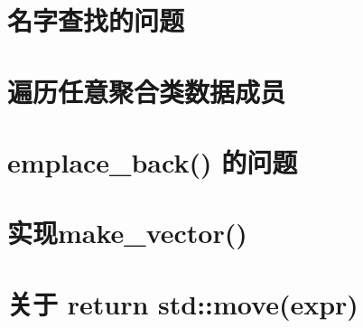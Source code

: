 \documentclass[11pt,fancyhdr]{ctexart}
\begin{document}
\section{名字查找的问题}

\section{遍历任意聚合类数据成员}

\section{emplace\_back() 的问题}

\section{实现make\_vector()}

\section{关于 return std::move(expr)}
\end{document}
